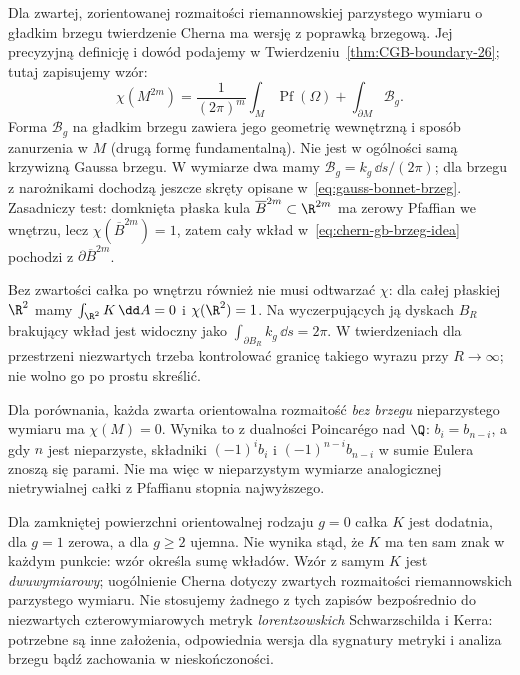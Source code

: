Dla zwartej, zorientowanej rozmaitości riemannowskiej
parzystego wymiaru o gładkim brzegu twierdzenie Cherna
ma wersję z poprawką brzegową. Jej precyzyjną definicję
i dowód podajemy w
Twierdzeniu~\ref{thm:CGB-boundary-26}; tutaj zapisujemy wzór:
\begin{equation}\label{eq:chern-gb-brzeg-idea}
 \chi(M^{2m})=
 \frac1{(2\pi)^m}\int_M\operatorname{Pf}(\Omega)
 +\int_{\partial M}\mathcal B_g.
\end{equation}
Forma $\mathcal B_g$ na gładkim brzegu zawiera jego
geometrię wewnętrzną i sposób zanurzenia w $M$
(drugą formę fundamentalną). Nie jest w ogólności
samą krzywizną Gaussa brzegu. W wymiarze dwa mamy
$\mathcal B_g=k_g\,\dd s/(2\pi)$; dla brzegu
z narożnikami dochodzą jeszcze skręty opisane
w~\eqref{eq:gauss-bonnet-brzeg}. Zasadniczy test:
domknięta płaska kula $\overline B^{2m}\subset\R^{2m}$
ma zerowy Pfaffian we wnętrzu, lecz $\chi(\overline B^{2m})=1$,
zatem cały wkład w~\eqref{eq:chern-gb-brzeg-idea}
pochodzi z $\partial\overline B^{2m}$.

Bez zwartości całka po wnętrzu również nie musi
odtwarzać $\chi$: dla całej płaskiej $\R^2$
mamy $\int_{\R^2}K\,\dd A=0$ i $\chi(\R^2)=1$.
Na wyczerpujących ją dyskach $B_R$ brakujący wkład
jest widoczny jako $\int_{\partial B_R}k_g\,\dd s=2\pi$.
W twierdzeniach dla przestrzeni niezwartych trzeba
kontrolować granicę takiego wyrazu przy $R\to\infty$;
nie wolno go po prostu skreślić.

Dla porównania, każda zwarta orientowalna rozmaitość
\emph{bez brzegu} nieparzystego wymiaru ma $\chi(M)=0$.
Wynika to z dualności Poincarégo nad $\Q$:
$b_i=b_{n-i}$, a gdy $n$ jest nieparzyste,
składniki $(-1)^i b_i$ i $(-1)^{n-i}b_{n-i}$
w sumie Eulera znoszą się parami. Nie ma więc
w nieparzystym wymiarze analogicznej nietrywialnej
całki z Pfaffianu stopnia najwyższego.

\begin{uwaga}
Dla zamkniętej powierzchni orientowalnej rodzaju $g=0$
całka $K$ jest dodatnia, dla $g=1$ zerowa, a dla
$g\geq2$ ujemna. Nie wynika stąd, że $K$ ma ten sam
znak w każdym punkcie: wzór określa sumę wkładów.
Wzór z samym $K$ jest \emph{dwuwymiarowy};
uogólnienie Cherna dotyczy zwartych rozmaitości
riemannowskich parzystego wymiaru. Nie stosujemy
żadnego z tych zapisów bezpośrednio do niezwartych
czterowymiarowych metryk \emph{lorentzowskich}
Schwarzschilda i Kerra: potrzebne są inne założenia,
odpowiednia wersja dla sygnatury metryki i analiza brzegu
bądź zachowania w nieskończoności.
\end{uwaga}

